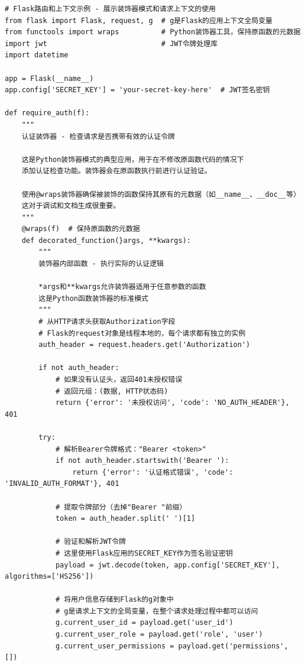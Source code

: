 \begin{lstlisting}[style=python]
# Flask路由和上下文示例 - 展示装饰器模式和请求上下文的使用
from flask import Flask, request, g  # g是Flask的应用上下文全局变量
from functools import wraps          # Python装饰器工具，保持原函数的元数据
import jwt                           # JWT令牌处理库
import datetime

app = Flask(__name__)
app.config['SECRET_KEY'] = 'your-secret-key-here'  # JWT签名密钥

def require_auth(f):
    """
    认证装饰器 - 检查请求是否携带有效的认证令牌
    
    这是Python装饰器模式的典型应用，用于在不修改原函数代码的情况下
    添加认证检查功能。装饰器会在原函数执行前进行认证验证。
    
    使用@wraps装饰器确保被装饰的函数保持其原有的元数据（如__name__、__doc__等）
    这对于调试和文档生成很重要。
    """
    @wraps(f)  # 保持原函数的元数据
    def decorated_function(}args, **kwargs):
        """
        装饰器内部函数 - 执行实际的认证逻辑
        
        *args和**kwargs允许装饰器适用于任意参数的函数
        这是Python函数装饰器的标准模式
        """
        # 从HTTP请求头获取Authorization字段
        # Flask的request对象是线程本地的，每个请求都有独立的实例
        auth_header = request.headers.get('Authorization')
        
        if not auth_header:
            # 如果没有认证头，返回401未授权错误
            # 返回元组：(数据, HTTP状态码)
            return {'error': '未授权访问', 'code': 'NO_AUTH_HEADER'}, 401
        
        try:
            # 解析Bearer令牌格式："Bearer <token>"
            if not auth_header.startswith('Bearer '):
                return {'error': '认证格式错误', 'code': 'INVALID_AUTH_FORMAT'}, 401
            
            # 提取令牌部分（去掉"Bearer "前缀）
            token = auth_header.split(' ')[1]
            
            # 验证和解析JWT令牌
            # 这里使用Flask应用的SECRET_KEY作为签名验证密钥
            payload = jwt.decode(token, app.config['SECRET_KEY'], algorithms=['HS256'])
            
            # 将用户信息存储到Flask的g对象中
            # g是请求上下文的全局变量，在整个请求处理过程中都可以访问
            g.current_user_id = payload.get('user_id')
            g.current_user_role = payload.get('role', 'user')
            g.current_user_permissions = payload.get('permissions', [])
            

\end{lstlisting}
